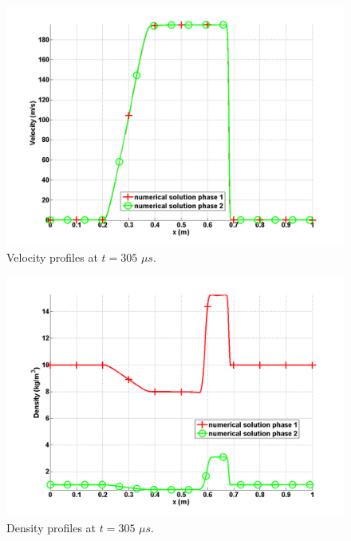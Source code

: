 %
\begin{figure}[H]
\centering
\includegraphics[width=\textwidth]{figures/SEM/relaxation_two_phases_velocity.png}
\caption{Velocity profiles at $t=305$ $\mu s$.}
\label{fig:two-fluids-rel-vel-7-eqn-sect4}
\end{figure}
%
\begin{figure}[H]
\centering
\includegraphics[width=\textwidth]{figures/SEM/relaxation_two_phases_density.png}
\caption{Density profiles at $t=305$ $\mu s$.}
\label{fig:two-fluids-rel-rho-7-eqn-sect4}
\end{figure}
%
